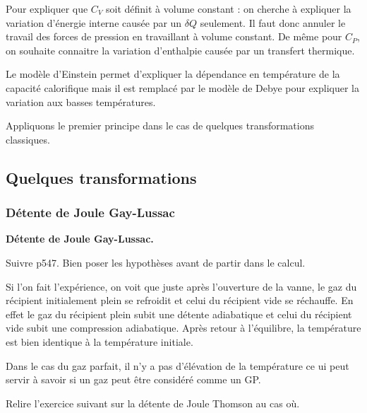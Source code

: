 \begin{remarque}
\noindent
Pour expliquer que $C_V$ soit définit à volume constant : on cherche à expliquer la variation d'énergie interne causée par un $\delta Q$ seulement.
Il faut donc annuler le travail des forces de pression en travaillant à volume constant.
De même pour $C_P$, on souhaite connaitre la variation d'enthalpie causée par un transfert thermique.

\noindent
Le modèle d'Einstein permet d'expliquer la dépendance en température de la capacité calorifique mais il est remplacé par le modèle de Debye pour expliquer la variation aux basses températures.
\end{remarque}

\begin{transition}
Appliquons le premier principe dans le cas de quelques transformations classiques.
\end{transition}

\subsection{Quelques transformations}

\subsubsection{Détente de Joule Gay-Lussac}

\begin{slide}
\textbf{Détente de Joule Gay-Lussac.}
\end{slide}

Suivre \cite{Michel2017} p547.
Bien poser les hypothèses avant de partir dans le calcul.

\begin{remarque}
Si l'on fait l'expérience, on voit que juste après l'ouverture de la vanne, le gaz du récipient initialement plein se refroidit et celui du récipient vide se réchauffe.
En effet le gaz du récipient plein subit une détente adiabatique et celui du récipient vide subit une compression adiabatique.
Après retour à l'équilibre, la température est bien identique à la température initiale.
\end{remarque}

Dans le cas du gaz parfait, il n'y a pas d'élévation de la température ce ui peut servir à savoir si un gaz peut être considéré comme un GP.

\begin{remarque}
Relire l'exercice suivant sur la détente de Joule Thomson au cas où.
\end{remarque}

